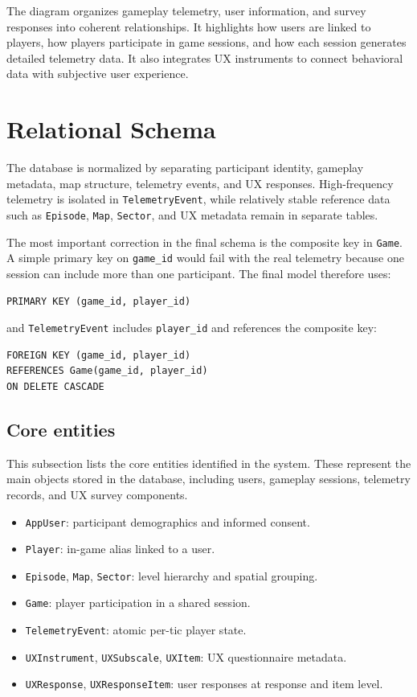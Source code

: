 \documentclass[11pt]{article}
\begin{document}
The diagram organizes gameplay telemetry, user information, and survey responses into coherent relationships. It highlights how users are linked to players, how players participate in game sessions, and how each session generates detailed telemetry data. It also integrates UX instruments to connect behavioral data with subjective user experience.



\section{Relational Schema}

The database is normalized by separating participant identity, gameplay metadata, map structure, telemetry events, and UX responses. High-frequency telemetry is isolated in \texttt{TelemetryEvent}, while relatively stable reference data such as \texttt{Episode}, \texttt{Map}, \texttt{Sector}, and UX metadata remain in separate tables.

The most important correction in the final schema is the composite key in \texttt{Game}. A simple primary key on \texttt{game\_id} would fail with the real telemetry because one session can include more than one participant. The final model therefore uses:

\begin{lstlisting}[style=sqlstyle]
PRIMARY KEY (game_id, player_id)
\end{lstlisting}

and \texttt{TelemetryEvent} includes \texttt{player\_id} and references the composite key:

\begin{lstlisting}[style=sqlstyle]
FOREIGN KEY (game_id, player_id)
REFERENCES Game(game_id, player_id)
ON DELETE CASCADE
\end{lstlisting}


\subsection{Core entities}
This subsection lists the core entities identified in the system. These represent the main objects stored in the database, including users, gameplay sessions, telemetry records, and UX survey components.

\begin{itemize}
    \item \texttt{AppUser}: participant demographics and informed consent.
    \item \texttt{Player}: in-game alias linked to a user.
    \item \texttt{Episode}, \texttt{Map}, \texttt{Sector}: level hierarchy and spatial grouping.
    \item \texttt{Game}: player participation in a shared session.
    \item \texttt{TelemetryEvent}: atomic per-tic player state.
    \item \texttt{UXInstrument}, \texttt{UXSubscale}, \texttt{UXItem}: UX questionnaire metadata.
    \item \texttt{UXResponse}, \texttt{UXResponseItem}: user responses at response and item level.
\end{itemize}
\end{document}
